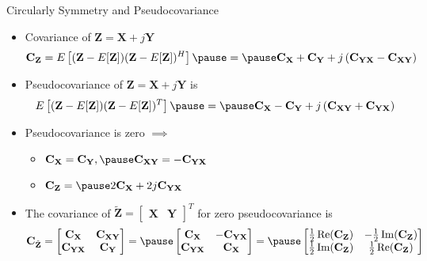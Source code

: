 \documentclass[t]{beamer}
\renewcommand\Re{\operatorname{Re}}
\renewcommand\Im{\operatorname{Im}}
\begin{document}
\begin{frame}{Circularly Symmetry and Pseudocovariance}
  \footnotesize
  \begin{itemize}
    \item \pause Covariance of $\mathbf{Z}=\mathbf{X}+j\mathbf{Y}$
      \begin{eqnarray*}
        \mathbf{C_Z} = E \left[ (\mathbf{Z} - E[\mathbf{Z}])(\mathbf{Z} - E[\mathbf{Z}])^H \right] \pause = \pause \mathbf{C_X} + \mathbf{C_Y} + j\left(\mathbf{C_{YX}} - \mathbf{C_{XY}}\right)
      \end{eqnarray*}
    \item \pause Pseudocovariance of $\mathbf{Z}=\mathbf{X}+j\mathbf{Y}$ is
      \begin{eqnarray*}
        E \left[ (\mathbf{Z} - E[\mathbf{Z}])(\mathbf{Z} - E[\mathbf{Z}])^T \right] \pause = \pause  \mathbf{C_X} - \mathbf{C_Y} + j\left(\mathbf{C_{XY}} + \mathbf{C_{YX}}\right)
      \end{eqnarray*}
    \item \pause Pseudocovariance is zero \pause $\implies$
      \begin{itemize}
        \footnotesize
        \item \pause $\mathbf{C_X} =  \mathbf{C_Y}, \pause \mathbf{C_{XY}} = -\mathbf{C_{YX}}$
        \item \pause $\mathbf{C_Z} = \pause 2\mathbf{C_X} + 2j\mathbf{C_{YX}}$
      \end{itemize}
    \item \pause The covariance of $\tilde{\mathbf{Z}} = \begin{bmatrix} \mathbf{X} & \mathbf{Y}\end{bmatrix}^T$ for zero pseudocovariance is
      \begin{equation*}
        \mathbf{C}_{\tilde{\mathbf{Z}}} = \begin{bmatrix} \mathbf{C}_\mathbf{X} & \mathbf{C}_{\mathbf{XY}} \\ \mathbf{C}_{\mathbf{YX}} & \mathbf{C}_\mathbf{Y} \end{bmatrix} = \pause \begin{bmatrix} \mathbf{C}_\mathbf{X} & -\mathbf{C}_{\mathbf{YX}} \\ \mathbf{C}_{\mathbf{YX}} & \mathbf{C}_\mathbf{X} \end{bmatrix} = \pause \begin{bmatrix} \frac{1}{2}\Re(\mathbf{C_Z}) & -\frac{1}{2}\Im(\mathbf{C_Z}) \\ \frac{1}{2}\Im(\mathbf{C_Z}) & \frac{1}{2}\Re(\mathbf{C_Z}) \end{bmatrix}
      \end{equation*}
  \end{itemize}
  \normalsize
\end{frame}
\end{document}
